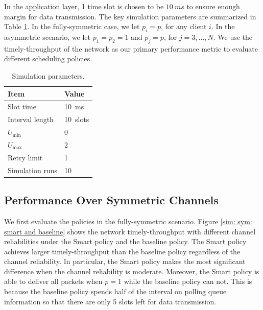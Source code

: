 \documentclass{article}
\begin{document}
In the application layer, 1 time slot is chosen to be $\SI{10}{ms}$ to ensure enough margin for data transmission. The key simulation parameters are summarized in Table \ref{table: parameter}. In the fully-symmetric case, we let $p_i = p$, for any client $i$. In the asymmetric scenario, we let $p_1 = p_2 = 1$ and $p_j = p$, for $j = 3, ..., N$. We use the timely-throughput of the network as our primary performance metric to evaluate different scheduling policies.
\begin{table}[htbp]
\centering
    \caption{Simulation parameters.}
    \vspace{2mm}
    \begin{tabular}{ | l | l | }
    \hline
    Item & Value \\ \hline
    Slot time & \SI{10}{ms}  \\ \hline
    Interval length & \SI{10}{slots} \\ \hline
    $U_{\min}$ & 0 \\ \hline
    $U_{\max}$ & 2 \\ \hline
    Retry limit & 1 \\ \hline
    Simulation runs & 10 \\
    \hline
\end{tabular}
\label{table: parameter}
\end{table}


\subsection{Performance Over Symmetric Channels}
We first evaluate the policies in the fully-symmetric scenario. Figure \ref{sim: sym: smart and baseline} shows the network timely-throughput with different channel reliabilities under the Smart policy and the baseline policy. The Smart policy achieves larger timely-throughput than the baseline policy regardless of the channel reliability. In particular, the Smart policy makes the most significant difference when the channel reliability is moderate. Moreover, the Smart policy is able to deliver all packets when $p=1$ while the baseline policy can not. This is because the baseline policy spends half of the interval on polling queue information so that there are only 5 slots left for data transmission. 
\end{document}
